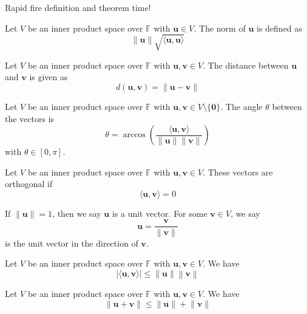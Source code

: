 Rapid fire definition and theorem time!
\begin{definition}[Norm]
    Let \(V\) be an inner product space over \(\mathbb{F} \) with \(\mathbf{u} \in V\). The norm of \(\mathbf{u} \) is defined as 
    \[
        \left\lVert \mathbf{u}  \right\rVert \sqrt{\langle \mathbf{u} ,\mathbf{u}  \rangle } 
    \]
\end{definition}
\begin{definition}[Distance]
    Let \(V\) be an inner product space over \(\mathbb{F} \) with \(\mathbf{u},\mathbf{v}  \in V\). The distance between \(\mathbf{u} \) and \(\mathbf{v} \) is given as 
    \[
        d(\mathbf{u} ,\mathbf{v} )=\left\lVert \mathbf{u} -\mathbf{v}  \right\rVert 
    \]
\end{definition}
\begin{definition}[Angle]
    Let \(V\) be an inner product space over \(\mathbb{F} \) with \(\mathbf{u},\mathbf{v}  \in V\setminus \{ \mathbf{0}  \} \). The angle \(\theta \) between the vectors is
    \[
        \theta =\arccos \left( \frac{\langle \mathbf{u} ,\mathbf{v}  \rangle }{\lVert \mathbf{u}  \rVert\lVert \mathbf{v}  \rVert  } \right) 
    \]
    with \(\theta \in [0,\pi ]\).
\end{definition}
\begin{definition}[Orthogonality]
    Let \(V\) be an inner product space over \(\mathbb{F} \) with \(\mathbf{u},\mathbf{v}  \in V\). These vectors are orthogonal if 
    \[
        \langle \mathbf{u} ,\mathbf{v}  \rangle=0 
    \]
\end{definition}
If \(\left\lVert \mathbf{u}  \right\rVert=1 \), then we say \(\mathbf{u} \) is a unit vector. For some \(\mathbf{v} \in V\), we say
\[
    \mathbf{u} =\frac{\mathbf{v} }{\lVert \mathbf{v}  \rVert }
\]
is the unit vector in the direction of \(\mathbf{v} \).
\begin{theorem}
    Let \(V\) be an inner product space over \(\mathbb{F} \) with \(\mathbf{u},\mathbf{v}  \in V\). We have 
    \[
        \left\vert \langle \mathbf{u} ,\mathbf{v}  \rangle  \right\vert \leq \left\lVert \mathbf{u}  \right\rVert\left\lVert \mathbf{v}  \right\rVert  
    \]
\end{theorem}
\begin{theorem}
    Let \(V\) be an inner product space over \(\mathbb{F} \) with \(\mathbf{u},\mathbf{v}  \in V\). We have 
    \[
        \left\lVert \mathbf{u} +\mathbf{v}  \right\rVert \leq \lVert \mathbf{u}  \rVert+\lVert \mathbf{v}  \rVert  
    \]
\end{theorem}
